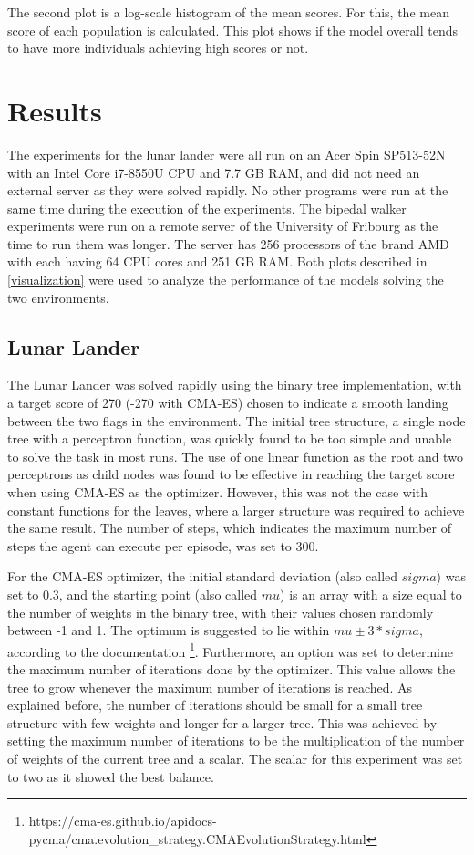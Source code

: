 The second plot is a log-scale histogram of the mean scores. For this, the mean score of each population is calculated. This plot shows if the model overall tends to have more individuals achieving high scores or not.

\section{Results}
The experiments for the lunar lander were all run on an Acer Spin SP513-52N with an Intel Core i7-8550U CPU and 7.7 GB RAM, and did not need an external server as they were solved rapidly. No other programs were run at the same time during the execution of the experiments. The bipedal walker experiments were run on a remote server of the University of Fribourg as the time to run them was longer. The server has 256 processors of the brand AMD with each having 64 CPU cores and 251 GB RAM. Both plots described in \ref{visualization} were used to analyze the performance of the models solving the two environments.

\subsection{Lunar Lander}
\label{lunar_lander}
The Lunar Lander was solved rapidly using the binary tree implementation, with a target score of 270 (-270 with CMA-ES) chosen to indicate a smooth landing between the two flags in the environment. The initial tree structure, a single node tree with a perceptron function, was quickly found to be too simple and unable to solve the task in most runs. The use of one linear function as the root and two perceptrons as child nodes was found to be effective in reaching the target score when using CMA-ES as the optimizer. However, this was not the case with constant functions for the leaves, where a larger structure was required to achieve the same result. The number of steps, which indicates the maximum number of steps the agent can execute per episode, was set to 300.

For the CMA-ES optimizer, the initial standard deviation (also called $sigma$) was set to 0.3, and the starting point (also called $mu$) is an array with a size equal to the number of weights in the binary tree, with their values chosen randomly between -1 and 1. The optimum is suggested to lie within $mu \pm 3*sigma$, according to the documentation \footnote{https://cma-es.github.io/apidocs-pycma/cma.evolution\_strategy.CMAEvolutionStrategy.html}. Furthermore, an option was set to determine the maximum number of iterations done by the optimizer. This value allows the tree to grow whenever the maximum number of iterations is reached. As explained before, the number of iterations should be small for a small tree structure with few weights and longer for a larger tree. This was achieved by setting the maximum number of iterations to be the multiplication of the number of weights of the current tree and a scalar. The scalar for this experiment was set to two as it showed the best balance.


